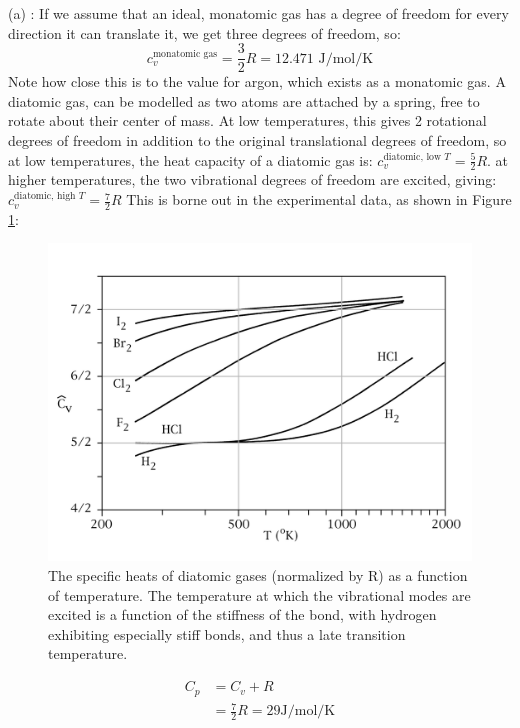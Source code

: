 \documentclass[12pt]{article}
\begin{document}
(a) : If we assume that an ideal, monatomic gas has a degree of freedom for every direction it can translate it, we get three degrees of freedom, so:
\begin{equation}
c_v^{\text{monatomic gas}} = \frac{3}{2} R = 12.471 \text{ J/mol/K}
\end{equation}
Note how close this is to the value for argon, which exists as a monatomic gas.   %
A diatomic gas, can be modelled as two atoms are attached by a spring, free to rotate about their center of mass. At low temperatures, this gives 2 rotational degrees of freedom in addition to the original translational degrees of freedom, so at low temperatures, the heat capacity of a diatomic gas is: $c_v^{\text{diatomic, low }T} = \frac{5}{2} R$.
at higher temperatures, the two vibrational degrees of freedom are excited, giving: $c_v^{\text{diatomic, high }T} = \frac{7}{2} R$
This is borne out in the experimental data, as shown in Figure \ref{CPofgases}:
\begin{figure}[h]
\centering
\includegraphics[width=\textwidth]{DiatomicSpecHeat2}
\caption{The specific heats of diatomic gases (normalized by R) as a function of temperature. The temperature at which the vibrational modes are excited is a function of the stiffness of the bond, with hydrogen exhibiting especially stiff bonds, and thus a late transition temperature.}
\label{CPofgases}
\end{figure}

\begin{align*}
C_p &= C_v + R\\
&= \frac{7}{2} R =  29 \text{J}/\text{mol}/\text{K}
\end{align*}
\end{document}
